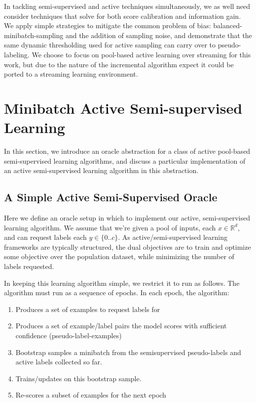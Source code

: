 \documentclass{article}
\begin{document}
In tackling semi-supervised and active techniques simultaneously, we as well need consider techniques that solve for both score calibration and information gain.  We apply simple strategies to mitigate the common problem of bias: balanced-minibatch-sampling and the addition of sampling noise, and demonstrate that the same dynamic thresholding used for active sampling can carry over to pseudo-labeling.  
We choose to focus on pool-based active learning over streaming for this work, but due to the nature of the incremental algorithm expect it could be ported to a streaming learning environment.  

\section{Minibatch Active Semi-supervised Learning}
In this section, we introduce an oracle abstraction for a class of active pool-based semi-supervised learning algorithms, and discuss a particular implementation of an active semi-supervised learning algorithm in this abstraction.

\subsection{A Simple Active Semi-Supervised Oracle}
Here we define an oracle setup in which to implement our active, semi-supervised learning algorithm.  We assume that we're given a pool of inputs, each $x \in \mathbb{R}^{d}$, and can request labels each $y\in\{0..c\}$.  As active/semi-supervised learning frameworks are typically structured, the dual objectives are to train and optimize some objective over the population dataset, while minimizing the number of labels requested.  

In keeping this learning algorithm simple, we restrict it to run as follows.  The algorithm must run as a sequence of epochs.  In each epoch, the algorithm:
\begin{enumerate}
\item Produces a set of examples to request labels for
\item Produces a set of example/label pairs the model scores with sufficient confidence (pseudo-label-examples)
\item Bootstrap samples a minibatch from the semisupervised pseudo-labels and active labels collected so far.
\item Trains/updates on this bootstrap sample.
\item Re-scores a subset of examples for the next epoch
\end{enumerate}
\end{document}
